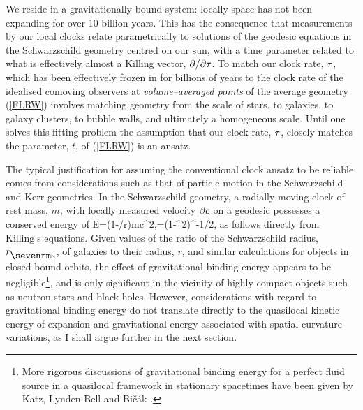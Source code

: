\documentclass[12pt]{article}
\begin{document}
We reside in a gravitationally bound system: locally space has not
been expanding for over 10 billion years. This has the consequence that
measurements by our local clocks relate parametrically to solutions of the
geodesic equations in the Schwarzschild geometry centred on our sun, with
a time parameter related to what is effectively almost a Killing vector,
$\partial/\partial\tau$. To match our clock rate, $\tau$, which has been effectively
frozen in for billions of years to the clock rate of the idealised
comoving observers at {\em volume--averaged points} of the average geometry
(\ref{FLRW}) involves matching geometry from the scale of stars, to galaxies,
to galaxy clusters, to bubble walls, and ultimately a homogeneous scale.
Until one solves this fitting problem \cite{fit1,fit2} the assumption that our
clock rate, $\tau$, closely matches the parameter, $t$, of (\ref{FLRW}) is
an ansatz.

The typical justification for assuming the conventional clock ansatz to be
reliable comes from considerations such as that of particle motion in the
Schwarzschild and Kerr geometries. In the Schwarzschild geometry, a
radially moving clock of rest mass, $m$, with locally measured velocity
$\beta c$ on a geodesic possesses a conserved energy of
\beq E=(1-\rs/r)\gamma mc^2,\qquad\gamma=(1-\be^2)^{-1/2},\label{bind}\eeq
as follows directly from Killing's
equations. Given values of the ratio of the Schwarzschild radius, $\rs$, of
galaxies to their radius, $r$, and similar calculations for objects in
closed bound orbits, the effect of gravitational binding energy appears to be
negligible\footnote{More rigorous discussions of gravitational binding
energy for a perfect fluid source in a quasilocal framework in stationary
spacetimes have been given by Katz, Lynden-Bell and Bi\v{c}\'ak \cite{KLB}.},
and is only significant in the vicinity of highly compact objects such as
neutron stars and black holes. However, considerations with regard to
gravitational binding energy do not translate directly to the quasilocal
kinetic energy of expansion and gravitational energy associated with spatial
curvature variations, as I shall argue further in the next section.
\end{document}
